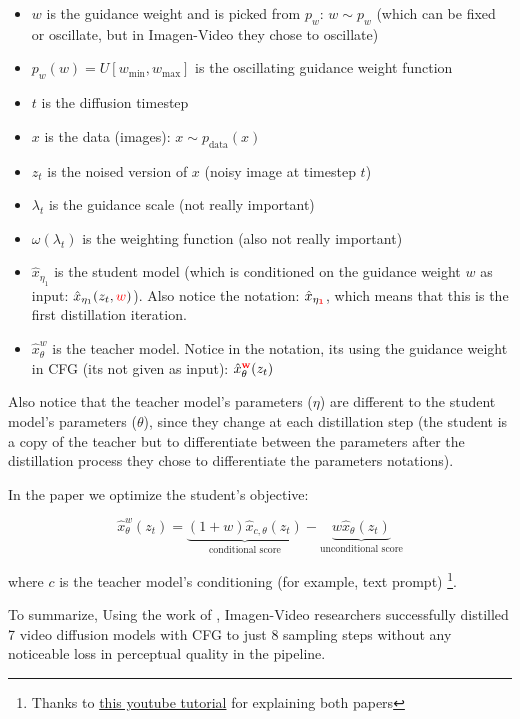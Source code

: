 \begin{itemize}
    \item $w$ is the guidance weight and is picked from $p_w$: $w \sim p_w$ (which can be fixed or oscillate, but in Imagen-Video they chose to oscillate)
    \item $p_w(w) = U[w_{\text{min}}, w_{\text{max}}]$ is the oscillating guidance weight function
    \item $t$ is the diffusion timestep
    \item $x$ is the data (images): $x \sim p_{\text{data}}(x)$
    \item $z_t$ is the noised version of $x$ (noisy image at timestep $t$)
    \item $\lambda_t$ is the guidance scale (not really important)
    \item $\omega(\lambda_t)$ is the weighting function (also not really important)
    \item $\hat{x}_{\eta_1}$ is the student model (which is conditioned on the guidance weight $w$ as input: $\hat{x}_{\eta_1}(z_t, \textcolor{red}{w})$). Also notice the notation: $\hat{x}_{\eta_\mathbf{\textcolor{red}{1}}}$, which means that this is the first distillation iteration.
    \item $\hat{x}_{\theta}^w$ is the teacher model. Notice in the notation, its using the guidance weight in CFG (its not given as input): $\hat{x}_{\theta}^\mathbf{\textcolor{red}{w}}(z_t)$
\end{itemize}

Also notice that the teacher model's parameters ($\eta$) are different to the student model's parameters ($\theta$), since they change at each distillation step (the student is a copy of the teacher but to differentiate between the parameters after the distillation process they chose to differentiate the parameters notations).

In the \cite{meng2023distillation} paper we optimize the student's objective:

\[  
    \hat{x}_{\theta}^w(z_t) = 
    \underbrace{(1+w) \hat{x}_{c,\theta} (z_t)}_{\text{conditional score}} - 
    \underbrace{w \hat{x}_\theta (z_t)}_{\text{unconditional score}}
\]

where $c$ is the teacher model's conditioning (for example, text prompt) \footnote{Thanks to \href{https://www.youtube.com/watch?v=ZXuK6IRJlnk}{this youtube tutorial} for explaining both papers}.

To summarize, Using the work of \cite{meng2023distillation}, Imagen-Video researchers successfully distilled 7 video diffusion models with CFG to just 8 sampling steps without any noticeable loss in perceptual quality in the pipeline.

















